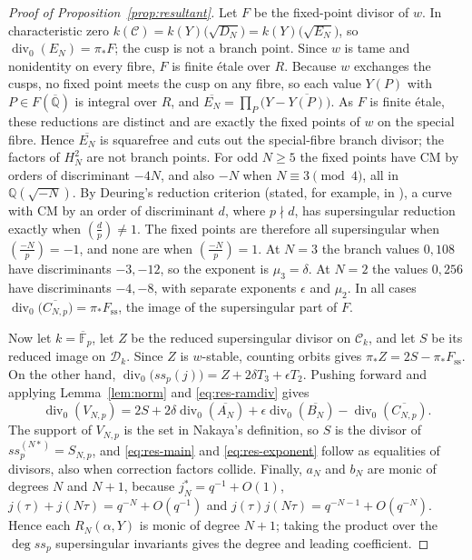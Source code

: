 \documentclass[11pt,a4paper]{article}
\theoremstyle{remark}\newtheorem{remark}[theorem]{Remark}
\numberwithin{equation}{section}
\newcommand{\Q}{\mathbb Q}\newcommand{\Z}{\mathbb Z}
\newcommand{\kk}{\overline{\mathbb F}_p}
\newcommand{\leg}[2]{\left(\frac{#1}{#2}\right)}
\begin{document}
\begin{proof}[Proof of Proposition~\ref{prop:resultant}]
		Let $F$ be the fixed-point divisor of $w$. In characteristic zero $k(\mathcal C)=k(Y)\bigl(\sqrt{D_N}\bigr)=k(Y)\bigl(\sqrt{E_N}\bigr)$, so $\operatorname{div}_0(E_N)=\pi_*F$; the cusp is not a branch point. Since $w$ is tame and nonidentity on every fibre, $F$ is finite \'etale over $R$. Because $w$ exchanges the cusps, no fixed point meets the cusp on any fibre, so each value $Y(P)$ with $P\in F(\overline{\Q})$ is integral over $R$, and $\overline{E_N}=\prod_{P}\bigl(Y-\overline{Y(P)}\bigr)$. As $F$ is finite \'etale, these reductions are distinct and are exactly the fixed points of $w$ on the special fibre. Hence $\overline{E_N}$ is squarefree and cuts out the special-fibre branch divisor; the factors of $H_N^2$ are not branch points. For odd $N\geq5$ the fixed points have CM by orders of discriminant $-4N$, and also $-N$ when $N\equiv3\pmod4$, all in $\Q(\sqrt{-N})$. By Deuring's reduction criterion (stated, for example, in \cite[Section~1]{MortonFricke}), a curve with CM by an order of discriminant $d$, where $p\nmid d$, has supersingular reduction exactly when $\leg{d}{p}\neq1$. The fixed points are therefore all supersingular when $\leg{-N}{p}=-1$, and none are when $\leg{-N}{p}=1$. At $N=3$ the branch values $0,108$ have discriminants $-3,-12$, so the exponent is $\mu_3=\delta$. At $N=2$ the values $0,256$ have discriminants $-4,-8$, with separate exponents $\epsilon$ and $\mu_2$. In all cases $\operatorname{div}_0\bigl(\overline{C_{N,p}}\bigr)=\pi_*F_{\mathrm{ss}}$, the image of the supersingular part of $F$.
		
		Now let $k=\kk$, let $Z$ be the reduced supersingular divisor on $\mathcal C_k$, and let $S$ be its reduced image on $\mathcal D_k$. Since $Z$ is $w$-stable, counting orbits gives $\pi_*Z=2S-\pi_*F_{\mathrm{ss}}$. On the other hand, $\operatorname{div}_0\bigl(ss_p(j)\bigr)=Z+2\delta T_3+\epsilon T_2$. Pushing forward and applying Lemma~\ref{lem:norm} and \eqref{eq:res-ramdiv} gives
		\[
		\operatorname{div}_0(V_{N,p})=2S+2\delta\operatorname{div}_0(\overline{A_N})+\epsilon\operatorname{div}_0(\overline{B_N})-\operatorname{div}_0(\overline{C_{N,p}}).
		\]
		The support of $V_{N,p}$ is the set in Nakaya's definition, so $S$ is the divisor of $ss_p^{(N*)}=S_{N,p}$, and \eqref{eq:res-main} and \eqref{eq:res-exponent} follow as equalities of divisors, also when correction factors collide. Finally, $a_N$ and $b_N$ are monic of degrees $N$ and $N+1$, because $j_N^*=q^{-1}+O(1)$, $j(\tau)+j(N\tau)=q^{-N}+O(q^{-1})$ and $j(\tau)j(N\tau)=q^{-N-1}+O(q^{-N})$. Hence each $R_N(\alpha,Y)$ is monic of degree $N+1$; taking the product over the $\deg ss_p$ supersingular invariants gives the degree and leading coefficient.
	\end{proof}
	
\end{document}
